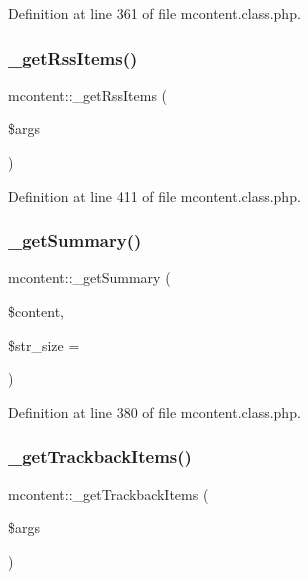 Definition at line 361 of file mcontent.\+class.\+php.

\mbox{\label{classmcontent_a0fe2153c16b911c8dc3fe1184a72d378}} 
\subsubsection{\texorpdfstring{\+\_\+get\+Rss\+Items()}{\_getRssItems()}}
{\footnotesize\ttfamily mcontent\+::\+\_\+get\+Rss\+Items (\begin{DoxyParamCaption}\item[{}]{\$args }\end{DoxyParamCaption})}



Definition at line 411 of file mcontent.\+class.\+php.

\mbox{\label{classmcontent_a4b4f237f52d20441108cadc2ffe0d43c}} 
\subsubsection{\texorpdfstring{\+\_\+get\+Summary()}{\_getSummary()}}
{\footnotesize\ttfamily mcontent\+::\+\_\+get\+Summary (\begin{DoxyParamCaption}\item[{}]{\$content,  }\item[{}]{\$str\+\_\+size = {} }\end{DoxyParamCaption})}



Definition at line 380 of file mcontent.\+class.\+php.

\mbox{\label{classmcontent_a8ef730735e4af7716442ae3c5d1b749a}} 
\subsubsection{\texorpdfstring{\+\_\+get\+Trackback\+Items()}{\_getTrackbackItems()}}
{\footnotesize\ttfamily mcontent\+::\+\_\+get\+Trackback\+Items (\begin{DoxyParamCaption}\item[{}]{\$args }\end{DoxyParamCaption})}


